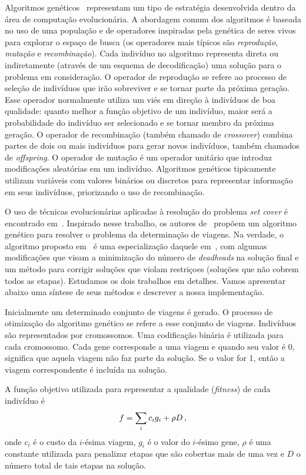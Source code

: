 Algoritmos genéticos~\cite{holland75, goldberg89} representam um tipo de estratégia desenvolvida
dentro da área de computação evolucionária. A abordagem comum dos algoritmos é baseada no uso de uma
população e de operadores inspiradas pela genética de seres vivos para explorar o espaço de busca
(os operadores mais típicos são {\it reprodução}, {\it mutação} e {\it recombinação}). Cada
indivíduo no algoritmo representa direta ou indiretamente (através de um esquema de decodificação)
uma solução para o problema em consideração. O operador de reprodução se refere ao processo de
seleção de indivíduos que irão sobreviver e se tornar parte da próxima geração. Esse operador
normalmente utiliza um viés em direção à indivíduos de boa qualidade: quanto melhor a função
objetivo de um indivíduo, maior será a probabilidade do indivíduo ser selecionado e se tornar membro
da próxima geração. O operador de recombinação (também chamado de {\it crossover}) combina partes de
dois ou mais indivíduos para gerar novos indivíduos, também chamados de {\it offspring}. O operador
de mutação é um operador unitário que introduz modificações aleatórias em um indivíduo. Algoritmos
genéticos tipicamente utilizam variáveis com valores binários ou discretos para representar
informação em seus indivíduos, priorizando o uso de recombinação.

O uso de técnicas evolucionárias aplicadas à resolução do problema {\it set cover} é encontrado
em~\cite{beasley95}. Inspirado nesse trabalho, os autores de~\cite{kornilakis02} propõem um
algoritmo genético para resolver o problema da determinação de viagens. Na verdade, o algoritmo
proposto em~\cite{kornilakis02} é uma especialização daquele em~\cite{beasley95}, com algumas
modificações que visam a minimização do número de {\it deadheads} na solução final e um método para
corrigir soluções que violam restriçoes (soluções que não cobrem todos as etapas). Estudamos os dois
trabalhos em detalhes. Vamos apresentar abaixo uma síntese de seus métodos e descrever a nossa
implementação.

Inicialmente um determinado conjunto de viagens é gerado. O processo de otimização do algoritmo
genético se refere a esse conjunto de viagens. Indivíduos são representados por cromossomos. Uma
codificação binária é utilizada para cada cromossomo. Cada gene corresponde a uma viagem e quando 
seu valor é 0, significa que aquela viagem não faz parte da solução. Se o valor for 1, então a 
viagem correspondente é incluída na solução.

A função objetivo utilizada para representar a qualidade ({\it fitness}) de cada indivíduo é
%
\begin{equation*}
	f = \sum_i c_i g_i + \rho D \, ,
\end{equation*}
%
onde $c_i$ é o custo da $i$-ésima viagem, $g_i$ é o valor do $i$-ésimo gene, $\rho$ é uma
constante utilizada para penalizar etapas que são cobertas mais de uma vez e $D$ o número total de
tais etapas na solução.

